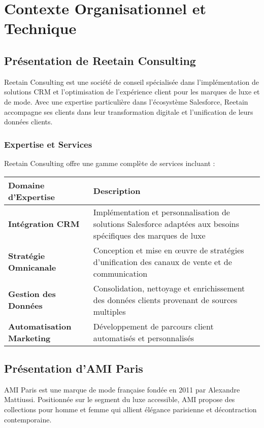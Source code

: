 
\chapter{Contexte Organisationnel et Technique}

\section{Présentation de Reetain Consulting}
\begin{mdframed}[backgroundcolor=lightgreen!20, linewidth=1pt]
Reetain Consulting est une société de conseil spécialisée dans l'implémentation de solutions CRM et l'optimisation de l'expérience client pour les marques de luxe et de mode. Avec une expertise particulière dans l'écosystème Salesforce, Reetain accompagne ses clients dans leur transformation digitale et l'unification de leurs données clients.
\end{mdframed}

\subsection{Expertise et Services}
Reetain Consulting offre une gamme complète de services incluant :

\begin{center}
\begin{tabular}{|>{
\bfseries}p{4cm}|p{9.5cm}|}
\hline
\rowcolor{lightblue} Domaine d'Expertise & Description \\
\hline
Intégration CRM & Implémentation et personnalisation de solutions Salesforce adaptées aux besoins spécifiques des marques de luxe \\
\hline
Stratégie Omnicanale & Conception et mise en œuvre de stratégies d'unification des canaux de vente et de communication \\
\hline
Gestion des Données & Consolidation, nettoyage et enrichissement des données clients provenant de sources multiples \\
\hline
Automatisation Marketing & Développement de parcours client automatisés et personnalisés \\
\hline
\end{tabular}
\end{center}

\section{Présentation d'AMI Paris}
AMI Paris est une marque de mode française fondée en 2011 par Alexandre Mattiussi. Positionnée sur le segment du luxe accessible, AMI propose des collections pour homme et femme qui allient élégance parisienne et décontraction contemporaine.

